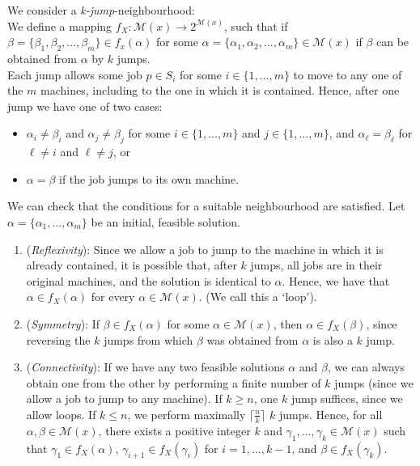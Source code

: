 \documentclass[12pt,a4paper,reqno]{article}
\begin{document}
We consider a \textit{k-jump}-neighbourhood: \\

We define a mapping $f_X: \mathcal{M}(x) \rightarrow 2^{\mathcal{M}(x)}$, such that if $\beta = \{\beta_1,\beta_2,...,\beta_m \} \in f_x(\alpha)$ for some $\alpha = \{\alpha_1,\alpha_2,...,\alpha_m \} \in \mathcal{M}(x)$ if $\beta$ can be obtained from $\alpha$ by $k$ jumps. \\

Each jump allows some job $p \in S_i$ for some $i \in \{1,...,m\}$ to move to any one of the $m$ machines, including to the one in which it is contained. Hence, after one jump we have one of two cases:
\begin{itemize}
\item $\alpha_i \neq \beta_i$ and $\alpha_j \neq \beta_j$ for some $i \in \{1,...,m\}$ and $j \in \{1,...,m\}$, and $\alpha_\ell = \beta_\ell$ for $\ell \neq i$ and $\ell \neq j$, or
\item $\alpha = \beta$ if the job jumps to its own machine. \\
\end{itemize}


We can check that the conditions for a suitable neighbourhood are satisfied. Let $\alpha = \{\alpha_1,...,\alpha_m\}$ be an initial, feasible solution.
\begin{enumerate}

\item (\textit{Reflexivity}): Since we allow a job to jump to the machine in which it is already contained, it is possible that, after $k$ jumps, all jobs are in their original machines, and the solution is identical to $\alpha$. Hence, we have that $\alpha \in f_X(\alpha)$ for every $\alpha \in \mathcal{M}(x)$. (We call this a `loop').

\item (\textit{Symmetry}): If $\beta \in f_X(\alpha)$ for some $\alpha \in \mathcal{M}(x)$, then $\alpha \in f_X(\beta)$, since reversing the $k$ jumps from which $\beta$ was obtained from $\alpha$ is also a $k$ jump.

\item (\textit{Connectivity}): If we have any two feasible solutions $\alpha$ and $\beta$, we can always obtain one from the other by performing a finite number of $k$ jumps (since we allow a job to jump to any machine). If $k \geq n$, one $k$ jump suffices, since we allow loops. If $k \leq n$, we perform maximally $\lceil \frac{n}{k} \rceil$ $k$ jumps. Hence, for all $\alpha, \beta \in \mathcal{M}(x)$, there exists a positive integer $k$ and $\gamma_1,...,\gamma_k \in \mathcal{M}(x)$ such that $\gamma_1 \in f_X(\alpha)$, $\gamma_{i+1} \in f_X(\gamma_i)$ for $i=1,...,k-1$, and $\beta \in f_X(\gamma_k)$.

\end{enumerate}
\end{document}
